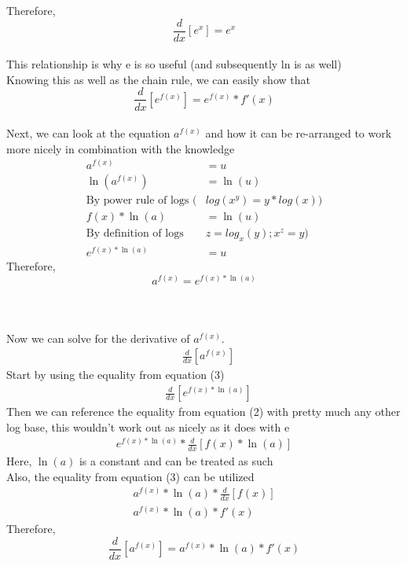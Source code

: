 \documentclass{article}
\newcommand{\ddx}{\frac{d}{dx}}
\begin{document}
	Therefore,
	\begin{equation}
		\ddx[e^x] = e^x
	\end{equation} \\
	This relationship is why e is so useful (and subsequently ln is as well) \\
	Knowing this as well as the chain rule, we can easily show that
	\begin{equation}
	\ddx[e^{f(x)}] = e^{f(x)} * f'(x)
	\end{equation} \\
Next, we can look at the equation $a^{f(x)}$ and how it can be re-arranged to work more nicely in combination with the knowledge
	\begin{align*}
		a^{f(x)} &= u \\
		\ln(a^{f(x)}) &= \ln(u) \\
		\text{By power rule of logs (}& log(x^y) = y*log(x) \text{)} \\
		f(x)*\ln(a) &= \ln(u) \\
		\text{By definition of logs }& z = log_x(y); x^z = y \text{)} \\
		e^{f(x)*\ln(a)} &= u
	\end{align*}
Therefore,
	\begin{equation}
		a^{f(x)} = e^{f(x)*\ln(a)}
	\end{equation} \\ \\ \\
Now we can solve for the derivative of $a^{f(x)}$.
	\begin{align*}
		&\ddx[a^{f(x)}]
	\end{align*}
	Start by using the equality from equation (3)
	\begin{align*}
		&\ddx[e^{f(x)*\ln(a)}]
	\end{align*}
	Then we can reference the equality from equation (2) with pretty much any other log base, this wouldn't work out as nicely as it does with e
	\begin{align*}
		e^{f(x)*\ln(a)}*\ddx[f(x)*\ln(a)]
	\end{align*}
	Here, $\ln(a)$ is a constant and can be treated as such \\
	Also, the equality from equation (3) can be utilized
	\begin{align*}
		a^{f(x)} * \ln(a) * \ddx[f(x)] \\
		a^{f(x)} * \ln(a) * f'(x)
	\end{align*}
Therefore,
	\begin{equation}
		\ddx[a^{f(x)}] = a^{f(x)} * \ln(a) * f'(x)
	\end{equation}
\end{document}
